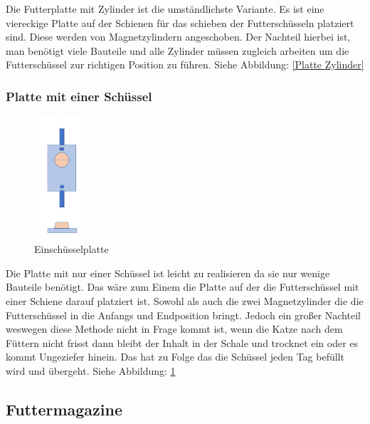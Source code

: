 Die Futterplatte mit Zylinder ist die umständlichste Variante. Es ist eine viereckige Platte auf der Schienen für das schieben der Futterschüsseln platziert sind. Diese werden von Magnetzylindern angeschoben. Der Nachteil hierbei ist, man benötigt viele Bauteile und alle Zylinder müssen zugleich arbeiten um die Futterschüssel zur richtigen Position zu führen. Siehe Abbildung: \ref{Platte Zylinder} 


\newpage
\subsubsection{Platte mit einer Schüssel}

\begin{figure}
\vspace{-40pt}
  \begin{center}
    \includegraphics[width=0.17\textwidth]{Bilder/Powerpoint/Einschuessel_platte}
  \end{center}
  \caption{Einschüsselplatte}
  \label{Schüssel Eins}
  \vspace{-10pt}
\end{figure}

Die Platte mit nur einer Schüssel ist leicht zu realisieren da sie nur wenige Bauteile benötigt. Das wäre zum Einem die Platte auf der die Futterschüssel mit einer Schiene darauf platziert ist. Sowohl als auch die zwei Magnetzylinder die die Futterschüssel in die Anfangs und Endposition bringt. Jedoch ein großer Nachteil weswegen diese Methode nicht in Frage kommt ist, wenn die Katze nach dem Füttern nicht frisst dann bleibt der Inhalt in der Schale und trocknet ein oder es kommt Ungeziefer hinein. Das hat zu Folge das die Schüssel jeden Tag befüllt wird und übergeht. Siehe Abbildung: \ref{Schüssel Eins} 



\subsection{Futtermagazine}

